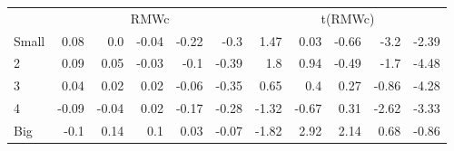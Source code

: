 \begin{table}[!ht]
\begin{tabular}{lrrrrrrrrrr}
  

      & \multicolumn{5}{c}{RMWc} & \multicolumn{5}{c}{t(RMWc)} \\
    \cmidrule(r){2-6} \cmidrule(r){7-11}
      Small  & 0.08  & 0.0  & -0.04  & -0.22  & -0.3   & 1.47  & 0.03  & -0.66  & -3.2  & -2.39  \\
          2  & 0.09  & 0.05  & -0.03  & -0.1  & -0.39   & 1.8  & 0.94  & -0.49  & -1.7  & -4.48  \\
          3  & 0.04  & 0.02  & 0.02  & -0.06  & -0.35   & 0.65  & 0.4  & 0.27  & -0.86  & -4.28  \\
          4  & -0.09  & -0.04  & 0.02  & -0.17  & -0.28   & -1.32  & -0.67  & 0.31  & -2.62  & -3.33  \\
      Big    & -0.1  & 0.14  & 0.1  & 0.03  & -0.07   & -1.82  & 2.92  & 2.14  & 0.68  & -0.86  \\

  

  \bottomrule
\end{tabular}
\label{tbl:25_Size_Vol_BS2015}
\end{table}